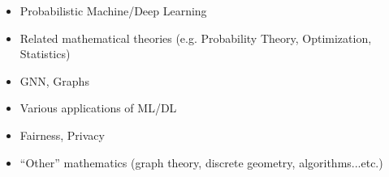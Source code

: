 \documentclass[10pt,a4]{article}
\begin{document}
\begin{small}
\begin{itemize}{}{}
\item Probabilistic Machine/Deep Learning

\item Related mathematical theories (e.g. Probability Theory, Optimization, Statistics)

\item GNN, Graphs

\item Various applications of ML/DL

\item Fairness, Privacy

\item ``Other'' mathematics (graph theory, discrete geometry, algorithms...etc.)
\end{itemize}
%
%
%

\end{small}
\end{document}

